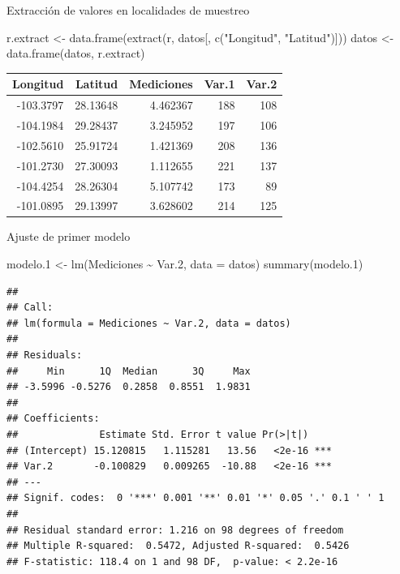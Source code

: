 \documentclass[
  11pt,
  ignorenonframetext,
]{beamer}
\newenvironment{Shaded}{}{}
\newcommand{\AttributeTok}[1]{\textcolor[rgb]{0.49,0.56,0.16}{#1}}
\newcommand{\FloatTok}[1]{\textcolor[rgb]{0.25,0.63,0.44}{#1}}
\newcommand{\FunctionTok}[1]{\textcolor[rgb]{0.02,0.16,0.49}{#1}}
\newcommand{\NormalTok}[1]{#1}
\newcommand{\OtherTok}[1]{\textcolor[rgb]{0.00,0.44,0.13}{#1}}
\newcommand{\SpecialCharTok}[1]{\textcolor[rgb]{0.25,0.44,0.63}{#1}}
\newcommand{\StringTok}[1]{\textcolor[rgb]{0.25,0.44,0.63}{#1}}
\begin{document}
\begin{frame}[fragile]{Extracción de valores en localidades de muestreo}
\protect\hypertarget{extracciuxf3n-de-valores-en-localidades-de-muestreo}{}
\begin{Shaded}
\begin{Highlighting}[]
\NormalTok{r.extract }\OtherTok{\textless{}{-}} \FunctionTok{data.frame}\NormalTok{(}\FunctionTok{extract}\NormalTok{(r, datos[, }\FunctionTok{c}\NormalTok{(}\StringTok{"Longitud"}\NormalTok{, }\StringTok{"Latitud"}\NormalTok{)]))}
\NormalTok{datos }\OtherTok{\textless{}{-}} \FunctionTok{data.frame}\NormalTok{(datos, r.extract)}
\end{Highlighting}
\end{Shaded}

\begin{longtable}[]{@{}rrrrr@{}}
\toprule()
Longitud & Latitud & Mediciones & Var.1 & Var.2 \\
\midrule()
\endhead
-103.3797 & 28.13648 & 4.462367 & 188 & 108 \\
-104.1984 & 29.28437 & 3.245952 & 197 & 106 \\
-102.5610 & 25.91724 & 1.421369 & 208 & 136 \\
-101.2730 & 27.30093 & 1.112655 & 221 & 137 \\
-104.4254 & 28.26304 & 5.107742 & 173 & 89 \\
-101.0895 & 29.13997 & 3.628602 & 214 & 125 \\
\bottomrule()
\end{longtable}
\end{frame}

\begin{frame}[fragile]{Ajuste de primer modelo}
\protect\hypertarget{ajuste-de-primer-modelo}{}
\begin{Shaded}
\begin{Highlighting}[]
\NormalTok{modelo}\FloatTok{.1} \OtherTok{\textless{}{-}} \FunctionTok{lm}\NormalTok{(Mediciones }\SpecialCharTok{\textasciitilde{}}\NormalTok{ Var}\FloatTok{.2}\NormalTok{, }\AttributeTok{data =}\NormalTok{ datos)}
\FunctionTok{summary}\NormalTok{(modelo}\FloatTok{.1}\NormalTok{)}
\end{Highlighting}
\end{Shaded}

\begin{verbatim}
## 
## Call:
## lm(formula = Mediciones ~ Var.2, data = datos)
## 
## Residuals:
##     Min      1Q  Median      3Q     Max 
## -3.5996 -0.5276  0.2858  0.8551  1.9831 
## 
## Coefficients:
##              Estimate Std. Error t value Pr(>|t|)    
## (Intercept) 15.120815   1.115281   13.56   <2e-16 ***
## Var.2       -0.100829   0.009265  -10.88   <2e-16 ***
## ---
## Signif. codes:  0 '***' 0.001 '**' 0.01 '*' 0.05 '.' 0.1 ' ' 1
## 
## Residual standard error: 1.216 on 98 degrees of freedom
## Multiple R-squared:  0.5472, Adjusted R-squared:  0.5426 
## F-statistic: 118.4 on 1 and 98 DF,  p-value: < 2.2e-16
\end{verbatim}
\end{frame}
\end{document}
